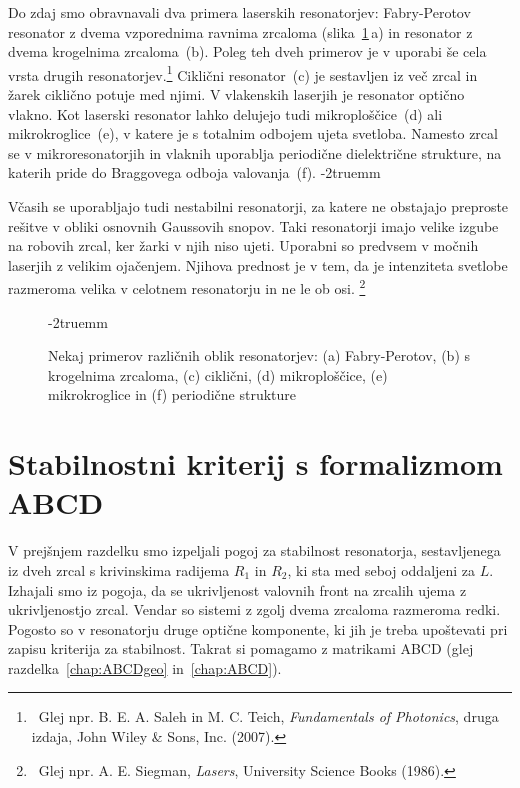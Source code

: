 Do zdaj smo obravnavali dva primera laserskih resonatorjev: Fabry-Perotov
resonator z dvema vzporednima ravnima zrcaloma (slika~\ref{fig:resonatorji}\,a) 
in resonator z dvema krogelnima zrcaloma~(b).
Poleg teh dveh primerov je v uporabi še cela vrsta drugih resonatorjev.\footnote{~Glej 
npr. B. E. A. Saleh in M. C. Teich, 
{\it Fundamentals of Photonics}, druga izdaja, John Wiley \& Sons, Inc. (2007).} Ciklični
resonator~(c) je
sestavljen iz več zrcal in žarek ciklično potuje med njimi. V vlakenskih laserjih je resonator
optično vlakno. 
Kot laserski resonator lahko delujejo tudi mikroploščice~(d) ali mikrokroglice~(e), 
v katere je s totalnim odbojem ujeta svetloba. 
Namesto zrcal se v mikroresonatorjih in vlaknih uporablja periodične dielektrične strukture, na katerih 
pride do Braggovega odboja valovanja~(f).
\vglue-2truemm
\begin{remark}
Včasih se uporabljajo tudi nestabilni resonatorji, za 
katere ne obstajajo preproste rešitve v obliki osnovnih Gaussovih snopov. Taki resonatorji 
imajo velike izgube na robovih zrcal, ker žarki v njih niso ujeti. 
Uporabni so predvsem v močnih laserjih z velikim ojačenjem. Njihova prednost je v tem, da 
je intenziteta svetlobe razmeroma velika v celotnem resonatorju in ne le ob 
osi. \footnote{~Glej npr. A. E. Siegman, {\it Lasers}, University Science Books (1986).}
\end{remark}
\begin{figure}[ht]
\centering
\def\svgwidth{135truemm} 

\caption{Nekaj primerov različnih oblik resonatorjev: (a) Fabry-Perotov, (b) s krogelnima
zrcaloma, (c) ciklični, (d) mikroploščice, (e) mikrokroglice in (f) periodične strukture}
\label{fig:resonatorji}
\vglue-2truemm
\end{figure}

\section{Stabilnostni kriterij s formalizmom ABCD}
V prejšnjem razdelku smo izpeljali pogoj za stabilnost resonatorja, 
sestavljenega iz dveh zrcal s krivinskima radijema $R_1$ in $R_2$, ki sta med 
seboj oddaljeni za $L$. Izhajali smo iz pogoja, da se ukrivljenost
valovnih front na zrcalih ujema z ukrivljenostjo zrcal. Vendar so sistemi z
zgolj dvema zrcaloma razmeroma redki. Pogosto so v resonatorju
druge optične komponente, ki jih je treba upoštevati pri zapisu
kriterija za stabilnost. Takrat si pomagamo z matrikami ABCD
(glej razdelka~\ref{chap:ABCDgeo} in~\ref{chap:ABCD}). 

